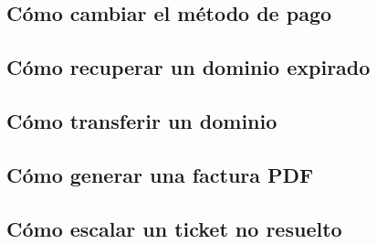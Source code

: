 \subsection{Cómo cambiar el método de pago}

\subsection{Cómo recuperar un dominio expirado}

\subsection{Cómo transferir un dominio}

\subsection{Cómo generar una factura PDF}

\subsection{Cómo escalar un ticket no resuelto}
